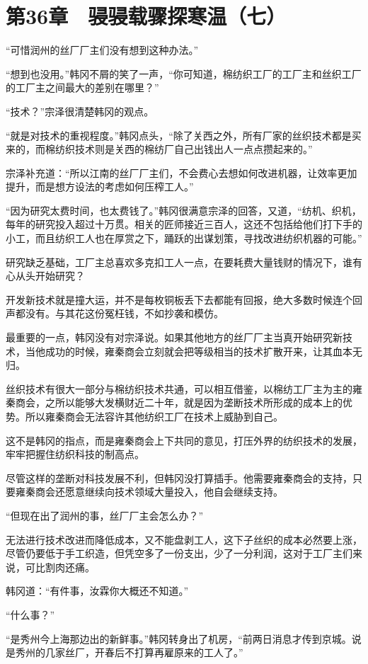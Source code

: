 \section{第36章　骎骎载骤探寒温（七）}

“可惜润州的丝厂厂主们没有想到这种办法。”

“想到也没用。”韩冈不屑的笑了一声，“你可知道，棉纺织工厂的工厂主和丝织工厂的工厂主之间最大的差别在哪里？”

“技术？”宗泽很清楚韩冈的观点。

“就是对技术的重视程度。”韩冈点头，“除了关西之外，所有厂家的丝织技术都是买来的，而棉纺织技术则是关西的棉纺厂自己出钱出人一点点攒起来的。”

宗泽补充道：“所以江南的丝厂厂主们，不会费心去想如何改进机器，让效率更加提升，而是想方设法的考虑如何压榨工人。”

“因为研究太费时间，也太费钱了。”韩冈很满意宗泽的回答，又道，“纺机、织机，每年的研究投入超过十万贯。相关的匠师接近三百人，这还不包括给他们打下手的小工，而且纺织工人也在厚赏之下，踊跃的出谋划策，寻找改进纺织机器的可能。”

研究缺乏基础，工厂主总喜欢多克扣工人一点，在要耗费大量钱财的情况下，谁有心从头开始研究？

开发新技术就是撞大运，并不是每枚铜板丢下去都能有回报，绝大多数时候连个回声都没有。与其花这份冤枉钱，不如抄袭和模仿。

最重要的一点，韩冈没有对宗泽说。如果其他地方的丝厂厂主当真开始研究新技术，当他成功的时候，雍秦商会立刻就会把等级相当的技术扩散开来，让其血本无归。

丝织技术有很大一部分与棉纺织技术共通，可以相互借鉴，以棉纺工厂主为主的雍秦商会，之所以能够大发横财近二十年，就是因为垄断技术所形成的成本上的优势。所以雍秦商会无法容许其他纺织工厂在技术上威胁到自己。

这不是韩冈的指点，而是雍秦商会上下共同的意见，打压外界的纺织技术的发展，牢牢把握住纺织科技的制高点。

尽管这样的垄断对科技发展不利，但韩冈没打算插手。他需要雍秦商会的支持，只要雍秦商会还愿意继续向技术领域大量投入，他自会继续支持。

“但现在出了润州的事，丝厂厂主会怎么办？”

无法进行技术改进而降低成本，又不能盘剥工人，这下子丝织的成本必然要上涨，尽管仍要低于手工织造，但凭空多了一份支出，少了一分利润，这对于工厂主们来说，可比割肉还痛。

韩冈道：“有件事，汝霖你大概还不知道。”

“什么事？”

“是秀州今上海那边出的新鲜事。”韩冈转身出了机房，“前两日消息才传到京城。说是秀州的几家丝厂，开春后不打算再雇原来的工人了。”


